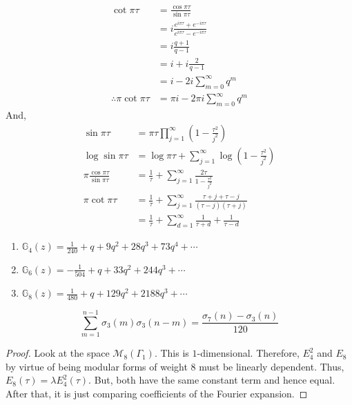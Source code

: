 \documentclass[oneside, 12pt]{scrbook}
\newcommand{\Mm}{\mathcal{M}}
\theoremstyle{theorem}
\begin{document}
\begin{remark}[DS, Exercise 1.1.5]
\begin{align*}
\cot \pi \tau &= \frac{\cos \pi \tau}{\sin \pi \tau} \\
&= i \frac{e^{i \pi \tau } + e^{-i \pi \tau }}{e^{i \pi \tau} - e^{-i \pi \tau}} \\
&= i \frac{q+1}{q-1} \\
&= i + i \frac{2}{q-1}\\
&= i - 2i \sum_{m=0}^{\infty} q^m\\
\therefore \pi \cot \pi \tau &= \pi i - 2\pi i \sum_{m=0}^{\infty} q^m
\end{align*}
And, 
\begin{align*}
\sin \pi \tau &= \pi \tau \prod_{j=1}^{\infty} \left( 1 - \frac{\tau^2}{j^2} \right) \\
\log \sin \pi \tau &= \log \pi \tau + \sum_{j=1}^{\infty} \log \left( 1 - \frac{\tau^2}{j^2} \right) \\
\pi \frac{\cos \pi \tau }{\sin \pi \tau} &= \frac{1}{\tau} + \sum_{j=1}^{\infty} \frac{2 \tau}{1- \frac{\tau^2}{j^2}} \\
\pi \cot \pi \tau &= \frac{1}{\tau} + \sum_{j=1}^{\infty} \frac{\tau + j + \tau - j}{(\tau - j)(\tau + j)} \\
&= \frac{1}{\tau} + \sum_{d=1}^{\infty} \frac{1}{\tau + d} + \frac{1}{\tau -d}
\end{align*}
\end{remark}

\begin{remark}
\begin{enumerate}
\item $\mathbb{G}_{4}(z) = \frac{1}{240} + q + 9q^2 + 28q^3 + 73q^4 + \cdots $
\item $\mathbb{G}_{6}(z) = -\frac{1}{504} + q + 33q^2 + 244q^3 + \cdots $
\item $\mathbb{G}_{8}(z) = \frac{1}{480} + q + 129q^2 + 2188q^3 + \cdots $
\end{enumerate}
\end{remark}

\begin{proposition}[DS, Exercise 1.1.7]
$$\sum_{m=1}^{n-1} \sigma_{3}(m) \sigma_{3}(n-m) = \frac{\sigma_{7}(n) - \sigma_{3}(n)}{120}$$
\end{proposition}

\begin{proof}
Look at the space $\Mm_{8}(\Gamma_{1})$. This is $1$-dimensional. Therefore, $E_{4}^2$ and $E_{8}$ by virtue of being modular forms of weight $8$ must be linearly dependent. Thus, $E_{8}(\tau) = \lambda E_{4}^{2}(\tau)$. But, both have the same constant term and hence equal. After that, it is just comparing coefficients of the Fourier expansion.
\end{proof}
\end{document}
